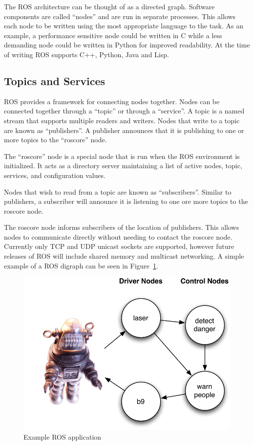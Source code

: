 The ROS architecture can be thought of as a directed graph. Software components are called ``nodes'' and are run in separate processes. This allows each node to be written using the most appropriate language to the task. As an example, a performance sensitive node could be written in C while a less demanding node could be written in Python for improved readability. At the time of writing ROS supports C++, Python, Java and Lisp.


\subsection{Topics and Services}
ROS provides a framework for connecting nodes together. Nodes can be connected together through a ``topic'' or through a ``service''. A topic is a named stream that supports multiple readers and writers. Nodes that write to a topic are known as ``publishers''. A publisher announces that it is publishing to one or more topics to the ``roscore'' node. 

The ``roscore'' node is a special node that is run when the ROS environment is initialized. It acts as a directory server maintaining a list of active nodes, topic, services, and configuration values.

Nodes that wish to read from a topic are known as ``subscribers''. Similar to publishers, a subscriber will announce it is listening to one ore more topics to the roscore node.

The roscore node informs subscribers of the location of publishers. This allows nodes to communicate directly without needing to contact the roscore node. Currently only TCP and UDP unicast sockets are supported, however future releases of ROS will include shared memory and multicast networking. A simple example of a ROS digraph can be seen in Figure~\ref{fig:middleware-ros}.

\begin{figure}[ht]
\includegraphics{images/middleware-ros.pdf}
\caption{Example ROS application\label{fig:middleware-ros}}
\end{figure}

